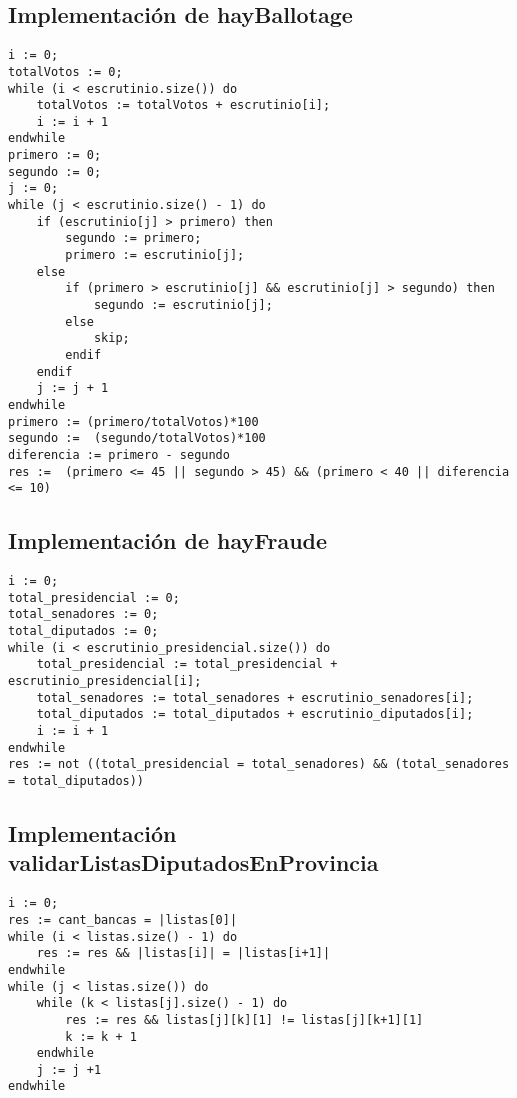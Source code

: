 \documentclass[10pt,a4paper]{article}
\begin{document}
\subsection{Implementación de hayBallotage}

	\begin{lstlisting}[caption={},label=code:for]
i := 0;
totalVotos := 0;
while (i < escrutinio.size()) do
	totalVotos := totalVotos + escrutinio[i];
	i := i + 1
endwhile
primero := 0;
segundo := 0;
j := 0;
while (j < escrutinio.size() - 1) do
	if (escrutinio[j] > primero) then
		segundo := primero;
		primero := escrutinio[j];
	else
		if (primero > escrutinio[j] && escrutinio[j] > segundo) then
			segundo := escrutinio[j];
		else
			skip;
		endif
	endif
	j := j + 1
endwhile
primero := (primero/totalVotos)*100
segundo :=  (segundo/totalVotos)*100
diferencia := primero - segundo
res :=  (primero <= 45 || segundo > 45) && (primero < 40 || diferencia <= 10) 
	\end{lstlisting}

\subsection{Implementación de hayFraude}

	\begin{lstlisting}[caption={},label=code:for]
i := 0;
total_presidencial := 0;
total_senadores := 0;
total_diputados := 0;
while (i < escrutinio_presidencial.size()) do
	total_presidencial := total_presidencial + escrutinio_presidencial[i];
	total_senadores := total_senadores + escrutinio_senadores[i];
	total_diputados := total_diputados + escrutinio_diputados[i];
	i := i + 1
endwhile
res := not ((total_presidencial = total_senadores) && (total_senadores = total_diputados))
	\end{lstlisting}

\subsection{Implementación validarListasDiputadosEnProvincia}

	\begin{lstlisting}[caption={},label=code:for]
i := 0;
res := cant_bancas = |listas[0]|
while (i < listas.size() - 1) do
	res := res && |listas[i]| = |listas[i+1]|
endwhile
while (j < listas.size()) do
	while (k < listas[j].size() - 1) do
		res := res && listas[j][k][1] != listas[j][k+1][1]
		k := k + 1
	endwhile
	j := j +1
endwhile
	\end{lstlisting}
\end{document}
